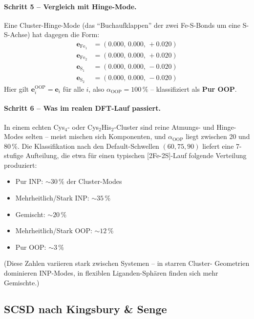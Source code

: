 \documentclass[11pt,a4paper,twoside]{article}
\newcommand{\OOP}{\mathrm{OOP}}
\theoremstyle{remark}
\begin{document}
\paragraph{Schritt 5 -- Vergleich mit Hinge-Mode.}
Eine Cluster-Hinge-Mode (das "`Buchaufklappen"' der zwei Fe-S-Bonds
um eine S-S-Achse) hat dagegen die Form:
\begin{align*}
  \mathbf{e}_{\text{Fe}_1} &= (0.000,\, 0.000,\, +0.020) \\
  \mathbf{e}_{\text{Fe}_2} &= (0.000,\, 0.000,\, +0.020) \\
  \mathbf{e}_{\text{S}_1}  &= (0.000,\, 0.000,\, -0.020) \\
  \mathbf{e}_{\text{S}_2}  &= (0.000,\, 0.000,\, -0.020)
\end{align*}
Hier gilt $\mathbf{e}_i^\text{OOP} = \mathbf{e}_i$ f\"ur alle $i$,
also $\alpha_{\OOP} = 100\,\%$ -- klassifiziert als \textbf{Pur OOP}.

\paragraph{Schritt 6 -- Was im realen DFT-Lauf passiert.}
In einem echten Cys$_4$- oder Cys$_2$His$_2$-Cluster sind reine
Atmungs- und Hinge-Modes selten -- meist mischen sich Komponenten,
und $\alpha_{\OOP}$ liegt zwischen 20 und 80\,\%. Die Klassifikation
nach den Default-Schwellen $(60, 75, 90)$ liefert eine 7-stufige
Aufteilung, die etwa f\"ur einen typischen [2Fe-2S]-Lauf
folgende Verteilung produziert:
\begin{itemize}\setlength{\itemsep}{0pt}
  \item Pur INP: $\sim 30$\,\% der Cluster-Modes
  \item Mehrheitlich/Stark INP: $\sim 35$\,\%
  \item Gemischt: $\sim 20$\,\%
  \item Mehrheitlich/Stark OOP: $\sim 12$\,\%
  \item Pur OOP: $\sim 3$\,\%
\end{itemize}
(Diese Zahlen variieren stark zwischen Systemen -- in starren Cluster-
Geometrien dominieren INP-Modes, in flexiblen Liganden-Sph\"aren
finden sich mehr Gemischte.)

\subsection{SCSD nach Kingsbury \& Senge}
\label{sec:scsd}
\end{document}
